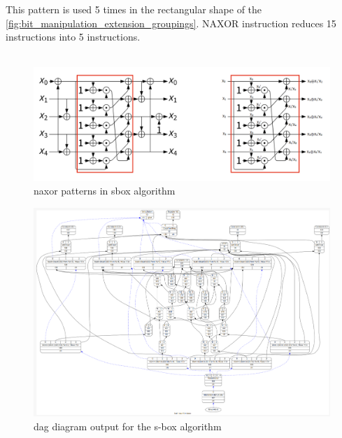 This pattern is used 5 times in the rectangular shape of the \ref{fig:bit_manipulation_extension_groupings}. NAXOR instruction reduces 15 instructions into 5 instructions.
\\\\
\begin{figure}
    \centering
    \includegraphics[scale=0.3]{adding_new_instr/sbox_naxor_pattern.png}
    \caption{naxor patterns in sbox algorithm}
    \label{fig:sbox_naxor_pattern}
\end{figure}


\begin{figure}
    \centering
    \includegraphics[scale=0.35]{adding_new_instr/naxor_dag_diagram.png}
    \caption{dag diagram output for the s-box algorithm}
    \label{fig:naxor_dag_diagram}
\end{figure}

